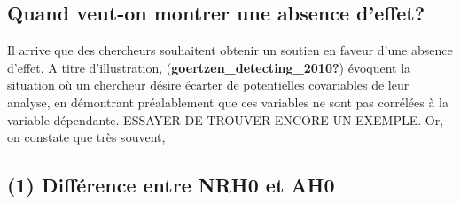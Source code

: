 \documentclass[
  english,
  man]{apa6}
\begin{document}
\hypertarget{quand-veut-on-montrer-une-absence-deffet}{%
\subsection{Quand veut-on montrer une absence d'effet?}\label{quand-veut-on-montrer-une-absence-deffet}}

Il arrive que des chercheurs souhaitent obtenir un soutien en faveur d'une absence d'effet. A titre d'illustration, (\textbf{goertzen\_detecting\_2010?}) évoquent la situation où un chercheur désire écarter de potentielles covariables de leur analyse, en démontrant préalablement que ces variables ne sont pas corrélées à la variable dépendante. ESSAYER DE TROUVER ENCORE UN EXEMPLE. Or, on constate que très souvent,

\hypertarget{diffuxe9rence-entre-nrh0-et-ah0}{%
\subsection{(1) Différence entre NRH0 et AH0}\label{diffuxe9rence-entre-nrh0-et-ah0}}
\end{document}
